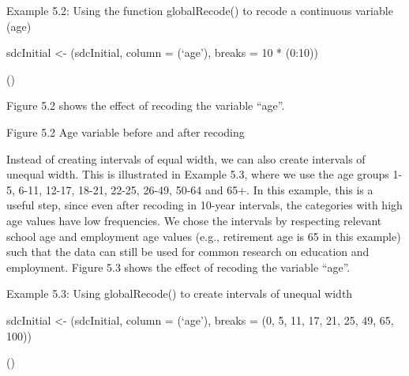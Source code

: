 \documentclass[letterpaper,10pt,english]{sphinxmanual}
\begin{document}
Example 5.2: Using the  function globalRecode() to recode a
continuous variable (age)

sdcInitial \textless{}- (sdcInitial, column = (‘age’),
breaks = 10 * (0:10))


\begin{DUlineblock}{0em}
\item[] ()
\item[] \sphinxcode{\sphinxupquote{\#\#   (0,10{]}  (10,20{]}  (20,30{]}  (30,40{]}  (40,50{]}  (50,60{]}  (60,70{]}  (70,80{]}  (80,90{]}  (90,100{]}}}
\item[] 
\end{DUlineblock}

Figure 5.2 shows the effect of recoding the variable “age”.

\noindent{}

Figure 5.2 Age variable before and after recoding

Instead of creating intervals of equal width, we can also create
intervals of unequal width. This is illustrated in Example 5.3, where we
use the age groups 1-5, 6-11, 12-17, 18-21, 22-25, 26-49, 50-64 and 65+.
In this example, this is a useful step, since even after recoding in
10-year intervals, the categories with high age values have low
frequencies. We chose the intervals by respecting relevant school age
and employment age values (e.g., retirement age is 65 in this example)
such that the data can still be used for common research on education
and employment. Figure 5.3 shows the effect of recoding the variable
“age”.

Example 5.3: Using globalRecode() to create intervals of unequal width

sdcInitial \textless{}- (sdcInitial, column = (‘age’),
breaks = (0, 5, 11, 17, 21, 25, 49, 65, 100))


()
\end{document}
